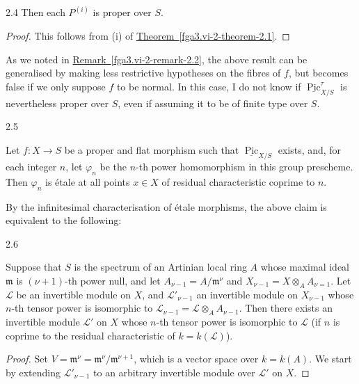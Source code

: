 \begin{corollary}{2.4}
    Then each \(P^{(i)}\) is proper over \(S\).\begin{proof}\par{}This follows from (i) of \hyperref[fga3.vi-2-theorem-2.1]{Theorem~\ref*{fga3.vi-2-theorem-2.1}}.\end{proof}\end{corollary}\par{}As we noted in \hyperref[fga3.vi-2-remark-2.2]{Remark~\ref*{fga3.vi-2-remark-2.2}}, the above result can be generalised by making less restrictive hypotheses on the fibres of \(f\), but becomes false if we only suppose \(f\) to be normal.
  In this case, I do not know if \(\underline {\operatorname {Pic}}_{X/S}^\tau \) is nevertheless proper over \(S\), even if assuming it to be of finite type over \(S\).\begin{theorem}{2.5}\label{fga3.vi-2-theorem-2.5}\skipsinglepar\par{}Let \(f\colon  X\to  S\) be a proper and flat morphism such that \(\underline {\operatorname {Pic}}_{X/S}\) exists, and, for each integer \(n\), let \(\varphi _n\) be the \(n\)-th power homomorphism in this group prescheme.
    Then \(\varphi _n\) is étale at all points \(x\in  X\) of residual characteristic coprime to \(n\).\end{theorem}\par{}By the infinitesimal characterisation of étale morphisms, the above claim is equivalent to the following:\begin{lemma}{2.6}\label{fga3.vi-2-lemma-2.6}\skipsinglepar\par{}Suppose that \(S\) is the spectrum of an Artinian local ring \(A\) whose maximal ideal \(\mathfrak {m}\) is \((\nu +1)\)-th power null, and let \(A_{\nu -1}=A/\mathfrak {m}^\nu \) and \(X_{\nu -1}=X\otimes _A A_{\nu =1}\).
    Let \(\mathscr {L}\) be an invertible module on \(X\), and \(\mathscr {L}'_{\nu -1}\) an invertible module on \(X_{\nu -1}\) whose \(n\)-th tensor power is isomorphic to \(\mathscr {L}_{\nu -1}=\mathscr {L}\otimes _A A_{\nu -1}\).
    Then there exists an invertible module \(\mathscr {L}'\) on \(X\) whose \(n\)-th tensor power is isomorphic to \(\mathscr {L}\) (if \(n\) is coprime to the residual characteristic of \(k=k(\mathscr {L})\)).\begin{proof}\par{}Set \(V=\mathfrak {m}^\nu =\mathfrak {m}^{\nu }/\mathfrak {m}^{\nu +1}\), which is a vector space over \(k=k(A)\).
      We start by extending \(\mathscr {L}'_{\nu -1}\) to an arbitrary invertible module over \(\mathscr {L}'\) on \(X\).

\end{proof}
\end{lemma}
